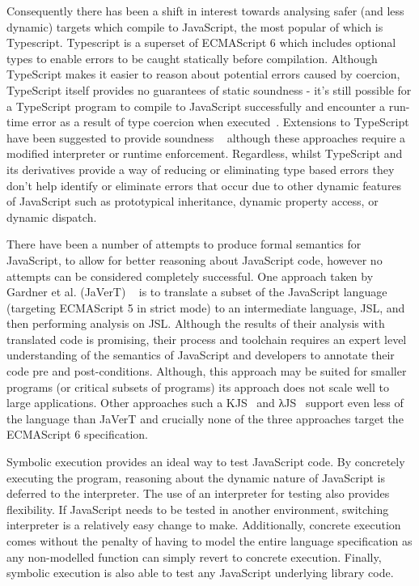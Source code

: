 \documentclass[]{final_report}
\begin{document}
Consequently there has been a shift in interest towards analysing safer (and less dynamic) targets which compile to JavaScript, the most popular of which is Typescript. Typescript is a superset of ECMAScript 6 which includes optional types to enable errors to be caught statically before compilation. Although TypeScript makes it easier to reason about potential errors caused by coercion, TypeScript itself provides no guarantees of static soundness - it's still possible for a TypeScript program to compile to JavaScript successfully and encounter a run-time error as a result of type coercion when executed~\cite{bierman2014understanding}. Extensions to TypeScript have been suggested to provide soundness ~\cite{richards2015concrete, rastogi2015safe} although these approaches require a modified interpreter or runtime enforcement. Regardless, whilst TypeScript and its derivatives provide a way of reducing or eliminating type based errors they don't help identify or eliminate errors that occur due to other dynamic features of JavaScript such as prototypical inheritance, dynamic property access, or dynamic dispatch.

There have been a number of attempts to produce formal semantics for JavaScript, to allow for better reasoning about JavaScript code, however no attempts can be considered completely successful. One approach taken by Gardner et al. (JaVerT) ~\cite{gardner2012towards, guha2010essence} is to translate a subset of the JavaScript language (targeting ECMAScript 5 in strict mode) to an intermediate language, JSL, and then performing analysis on JSL. Although the results of their analysis with translated code is promising, their process and toolchain requires an expert level understanding of the semantics of JavaScript and developers to annotate their code pre and post-conditions. Although, this approach may be suited for smaller programs (or critical subsets of programs) its approach does not scale well to large applications. Other approaches such a KJS~\cite{park2015kjs} and λJS~\cite{guha2010essence} support even less of the language than JaVerT and crucially none of the three approaches target the ECMAScript 6 specification.

Symbolic execution provides an ideal way to test JavaScript code. By concretely executing the program, reasoning about the dynamic nature of JavaScript is deferred to the interpreter. The use of an interpreter for testing also provides flexibility. If JavaScript needs to be tested in another environment, switching interpreter is a relatively easy change to make. Additionally, concrete execution comes without the penalty of having to model the entire language specification as any non-modelled function can simply revert to concrete execution. Finally, symbolic execution is also able to test any JavaScript underlying library code.
\end{document}
